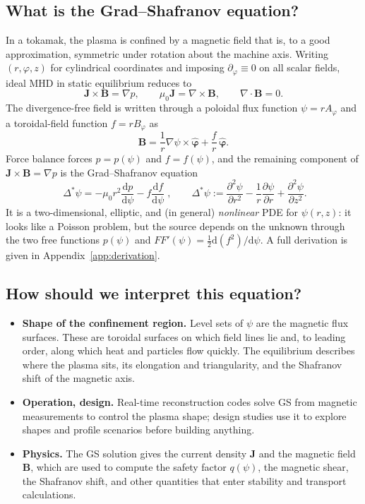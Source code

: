 \documentclass[11pt,a4paper]{article}
\newcommand{\dd}{\mathrm{d}}
\newcommand{\Dstar}{\Delta^{\!*}}
\newcommand{\bB}{\bm{B}}
\newcommand{\bJ}{\bm{J}}
\newcommand{\ephi}{\hat{\bm{\varphi}}}
\begin{document}
\subsection{What is the Grad--Shafranov equation?}
In a tokamak, the plasma is confined by a magnetic field that is, to a good approximation, symmetric under rotation about the machine axis. Writing $(r,\varphi,z)$ for cylindrical coordinates and imposing $\partial_\varphi\equiv 0$ on all scalar fields, ideal MHD in static equilibrium reduces to
\begin{equation}
\bJ\times\bB=\nabla p,\qquad \mu_0\bJ=\nabla\times\bB,\qquad \nabla\cdot\bB=0 .
\end{equation}
The divergence-free field is written through a poloidal flux function $\psi=rA_\varphi$ and a toroidal-field function $f=rB_\varphi$ as
\begin{equation}
\bB=\frac1r\nabla\psi\times\ephi+\frac{f}{r}\,\ephi .
\end{equation}
Force balance forces $p=p(\psi)$ and $f=f(\psi)$, and the remaining component of $\bJ\times\bB=\nabla p$ is the Grad--Shafranov equation
\begin{equation}
\boxed{\;\Dstar\psi=-\mu_0 r^2\frac{\dd p}{\dd\psi}-f\frac{\dd f}{\dd\psi}\;},\qquad
\Dstar\psi:=\frac{\partial^2\psi}{\partial r^2}-\frac1r\frac{\partial\psi}{\partial r}+\frac{\partial^2\psi}{\partial z^2}.
\label{eq:GS}
\end{equation}
It is a two-dimensional, elliptic, and (in general) \emph{nonlinear} PDE for $\psi(r,z)$: it looks like a Poisson problem, but the source depends on the unknown through the two free functions $p(\psi)$ and $FF'(\psi)=\tfrac12 \dd (f^2)/\dd\psi$. A full derivation is given in Appendix~\ref{app:derivation}.

\subsection{How should we interpret this equation?}
\begin{itemize}[nosep]
\item \textbf{Shape of the confinement region.} Level sets of $\psi$ are the magnetic flux surfaces. These are toroidal surfaces on which field lines lie and, to leading order, along which heat and particles flow quickly. The equilibrium describes where the plasma sits, its elongation and triangularity, and the Shafranov shift of the magnetic axis. 
\item \textbf{Operation, design.} Real-time reconstruction codes solve GS from magnetic measurements to control the plasma shape; design studies use it to explore shapes and profile scenarios before building anything.
\item \textbf{Physics.} The GS solution gives the current density $\bJ$ and the magnetic field $\bB$, which are used to compute the safety factor $q(\psi)$, the magnetic shear, the Shafranov shift, and other quantities that enter stability and transport calculations.
\end{itemize}
\end{document}
